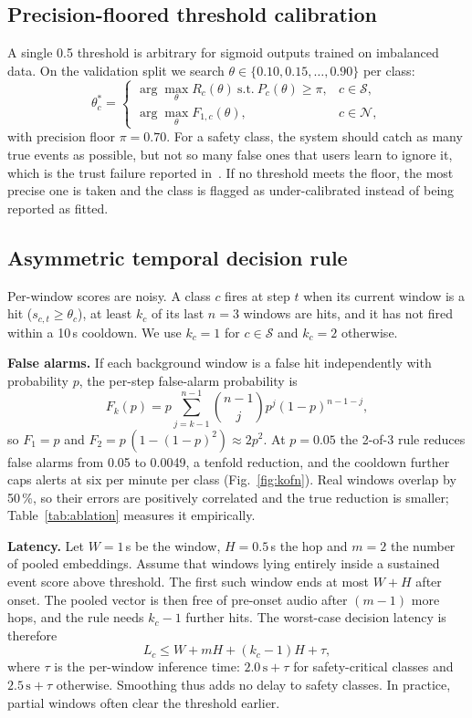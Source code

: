 \documentclass[conference]{IEEEtran}
\begin{document}
\subsection{Precision-floored threshold calibration}
A single 0.5 threshold is arbitrary for sigmoid outputs trained on imbalanced data. On the validation split we search $\theta\in\{0.10,0.15,\dots,0.90\}$ per class:
\begin{equation}
\theta_c^\ast=\begin{cases}
\arg\max_{\theta} R_c(\theta)\ \text{s.t.}\ P_c(\theta)\ge\pi, & c\in\mathcal{S},\\
\arg\max_{\theta} F_{1,c}(\theta), & c\in\mathcal{N},
\end{cases}
\end{equation}
with precision floor $\pi=0.70$. For a safety class, the system should catch as many true events as possible, but not so many false ones that users learn to ignore it, which is the trust failure reported in~\cite{jain2020homesound}. If no threshold meets the floor, the most precise one is taken and the class is flagged as under-calibrated instead of being reported as fitted.

\subsection{Asymmetric temporal decision rule}\label{sec:policy}
Per-window scores are noisy. A class $c$ fires at step $t$ when its current window is a hit ($s_{c,t}\ge\theta_c$), at least $k_c$ of its last $n=3$ windows are hits, and it has not fired within a 10\,s cooldown. We use $k_c=1$ for $c\in\mathcal{S}$ and $k_c=2$ otherwise.

\textbf{False alarms.} If each background window is a false hit independently with probability $p$, the per-step false-alarm probability is
\begin{equation}
F_k(p)=p\sum_{j=k-1}^{n-1}\binom{n-1}{j}p^{j}(1-p)^{n-1-j},
\end{equation}
so $F_1=p$ and $F_2=p\,(1-(1-p)^2)\approx 2p^2$. At $p=0.05$ the 2-of-3 rule reduces false alarms from 0.05 to 0.0049, a tenfold reduction, and the cooldown further caps alerts at six per minute per class (Fig.~\ref{fig:kofn}). Real windows overlap by 50\,\%, so their errors are positively correlated and the true reduction is smaller; Table~\ref{tab:ablation} measures it empirically.

\textbf{Latency.} Let $W=1$\,s be the window, $H=0.5$\,s the hop and $m=2$ the number of pooled embeddings. Assume that windows lying entirely inside a sustained event score above threshold. The first such window ends at most $W+H$ after onset. The pooled vector is then free of pre-onset audio after $(m-1)$ more hops, and the rule needs $k_c-1$ further hits. The worst-case decision latency is therefore
\begin{equation}
L_c \le W + mH + (k_c-1)H + \tau,
\end{equation}
where $\tau$ is the per-window inference time: $2.0\,\text{s}+\tau$ for safety-critical classes and $2.5\,\text{s}+\tau$ otherwise. Smoothing thus adds no delay to safety classes. In practice, partial windows often clear the threshold earlier.
\end{document}
